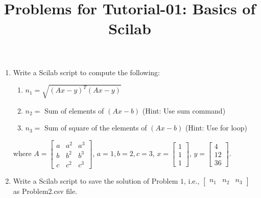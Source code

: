\documentclass[10pt,a4paper]{article}
\begin{document}
\title{Problems for Tutorial-01: Basics of Scilab}
\date{}
\maketitle
\begin{enumerate}
\item Write a Scilab script to compute the following:
\begin{enumerate}
\item $n_1 = \sqrt{(Ax - y)^T(Ax - y)}$
\item $n_2 = $ Sum of elements of $(Ax-b)$ (Hint: Use sum command)
\item $n_3 = $ Sum of square of the elements of $(Ax - b)$ (Hint: Use for loop)
\end{enumerate}
where $A = \begin{bmatrix}a & a^2 & a^3\\b & b^2 & b^3\\c & c^2 & c^3\end{bmatrix}$, 
$a = 1, b = 2, c = 3$, $x = \begin{bmatrix}1\\1\\1\end{bmatrix}$, 
$y = \begin{bmatrix}4\\12\\36\end{bmatrix}$.
\item Write a Scilab script to save the solution of Problem $1$, i.e., 
$\begin{bmatrix}n_1 & n_2 & n_3\end{bmatrix}$ as Problem2.csv file.
\end{enumerate}
\end{document}
